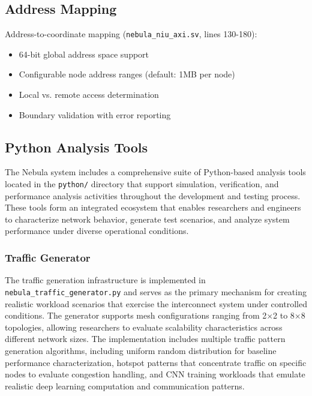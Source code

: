 \documentclass[12pt,letterpaper]{article}
\begin{document}
\subsection{Address Mapping}

Address-to-coordinate mapping (\texttt{nebula\_niu\_axi.sv}, lines 130-180):

\begin{itemize}
    \item 64-bit global address space support
    \item Configurable node address ranges (default: 1MB per node)
    \item Local vs. remote access determination
    \item Boundary validation with error reporting
\end{itemize}


\subsection{Python Analysis Tools}

The Nebula system includes a comprehensive suite of Python-based analysis tools located in the \texttt{python/} directory that support simulation, verification, and performance analysis activities throughout the development and testing process. These tools form an integrated ecosystem that enables researchers and engineers to characterize network behavior, generate test scenarios, and analyze system performance under diverse operational conditions.

\subsubsection{Traffic Generator}

The traffic generation infrastructure is implemented in \texttt{nebula\_traffic\_generator.py} and serves as the primary mechanism for creating realistic workload scenarios that exercise the interconnect system under controlled conditions. The generator supports mesh configurations ranging from 2×2 to 8×8 topologies, allowing researchers to evaluate scalability characteristics across different network sizes. The implementation includes multiple traffic pattern generation algorithms, including uniform random distribution for baseline performance characterization, hotspot patterns that concentrate traffic on specific nodes to evaluate congestion handling, and CNN training workloads that emulate realistic deep learning computation and communication patterns.
\end{document}
